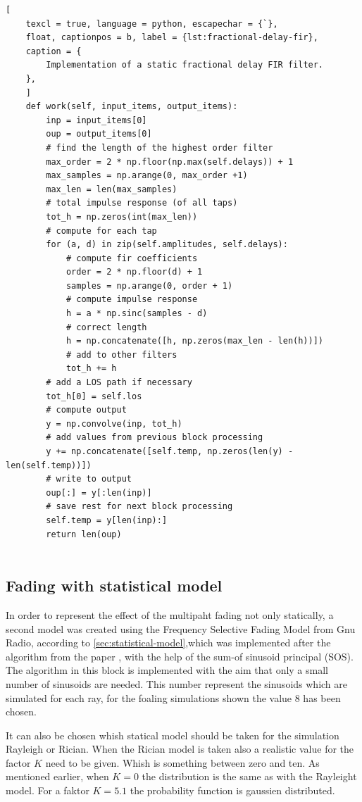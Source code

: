 \begin{lstlisting}[
	texcl = true, language = python, escapechar = {`},
	float, captionpos = b, label = {lst:fractional-delay-fir},
	caption = {
		Implementation of a static fractional delay FIR filter.
	},
	]
	def work(self, input_items, output_items):
		inp = input_items[0]
		oup = output_items[0]
		# find the length of the highest order filter
		max_order = 2 * np.floor(np.max(self.delays)) + 1
		max_samples = np.arange(0, max_order +1)
		max_len = len(max_samples)
		# total impulse response (of all taps)
		tot_h = np.zeros(int(max_len))
		# compute for each tap
		for (a, d) in zip(self.amplitudes, self.delays):
			# compute fir coefficients
			order = 2 * np.floor(d) + 1
			samples = np.arange(0, order + 1)
			# compute impulse response
			h = a * np.sinc(samples - d)
			# correct length
			h = np.concatenate([h, np.zeros(max_len - len(h))])
			# add to other filters
			tot_h += h
		# add a LOS path if necessary
		tot_h[0] = self.los
		# compute output
		y = np.convolve(inp, tot_h)
		# add values from previous block processing
		y += np.concatenate([self.temp, np.zeros(len(y) - len(self.temp))])
		# write to output
		oup[:] = y[:len(inp)]
		# save rest for next block processing
		self.temp = y[len(inp):]
		return len(oup)
	
\end{lstlisting}

\subsection{Fading with statistical model}

In order to represent the effect of the multipaht fading not only statically, a second model was created using the Frequency Selective Fading Model from Gnu Radio, according to \ref{sec:statistical-model},which was implemented after the algorithm from the paper \cite{Alimohammad2009}, with the help of the sum-of sinusoid principal (SOS). The algorithm in this block is implemented with the aim that only a small number of sinusoids are needed. 
This number represent the sinusoids which are simulated for each ray, for the foaling simulations shown the value 8 has been chosen.

It can also be chosen whish statical model should be taken for the simulation Rayleigh or Rician. When the Rician model is taken also a realistic value for the factor \(K\) need to be given. Whish is something between zero and ten. As mentioned earlier, when  \(K=0\) the distribution is the same as with the Rayleight model. For a faktor \(K = 5.1\) the probability function is gaussien distributed.

